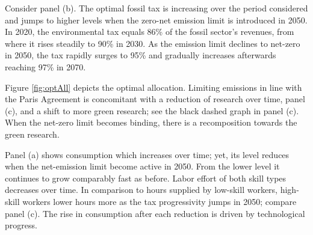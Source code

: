 

Consider panel (b). The optimal fossil tax is increasing over the period considered and jumps to higher levels when the zero-net emission limit is introduced in 2050.
In 2020, the environmental tax equals 86\% of the fossil sector's revenues, from where it rises steadily to 90\% in 2030.  As the emission limit declines to net-zero in 2050, the tax rapidly surges to 95\% and gradually increases afterwards reaching 97\% in 2070. 

Figure \ref{fig:optAll} depicts the optimal allocation. Limiting emissions in line with the Paris Agreement is concomitant with a reduction of research over time, panel (c), and a shift to more green research; see the black dashed graph in panel (c).  When the net-zero limit becomes binding, there is a recomposition towards the green research. 
 
Panel (a) shows consumption which increases over time; yet, its level reduces when the net-emission limit become active in  2050. From the lower level it continues to grow comparably fast as before. Labor effort of both skill types decreases over time.  In comparison to hours supplied by low-skill workers, high-skill workers lower hours more as the tax progressivity jumps in 2050; compare panel (c). 
The rise in consumption after each reduction is driven by technological progress.



